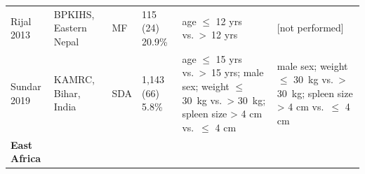 {\begin{landscape}
\begin{ThreePartTable}
\begin{longtable}[c]{@{} L{3.1cm} L{2.5cm} L{2cm} L{1.7cm} L{6cm} L{6cm} @{}}
      \hspace{0.5em}Rijal 2013\cite{rijal2013}     & BPKIHS, Eastern Nepal                                             & MF                                 & 115 (24) 20.9\%      & age $\leq$ 12 yrs\mtnote{**} vs.\ >~12 yrs                                                                                                                                                                                                                                                                                        & [not performed]                                                                                                                                                                                                                             \\
      \hspace{0.5em}Sundar 2019\cite{sundar2019}   & KAMRC, Bihar, India                                               & SDA                                & 1,143 (66) 5.8\%     & age $\leq$ 15 yrs\mtnote{*} vs.\ >~15 yrs; male sex\mtnote{**}; weight $\leq$ 30~kg\mtnote{**} vs.\ > 30~kg; spleen size > 4 cm\mtnote{***} vs.\ $\leq$ 4 cm                                                                                                                                                                      & male sex\mtnote{***}; weight $\leq$ 30~kg\mtnote{**} vs.\ > 30~kg; spleen size > 4 cm\mtnote{***} vs.\ $\leq$ 4 cm                                                                                                                          \\
      \midrule
      \textbf{East Africa}                         &                                                                   &                                    &                      &                                                                                                                                                                                                                                                                                                                                   &                                                                                                                                                                                                                                             \\*

\end{longtable}
\end{ThreePartTable}
\end{landscape}}
